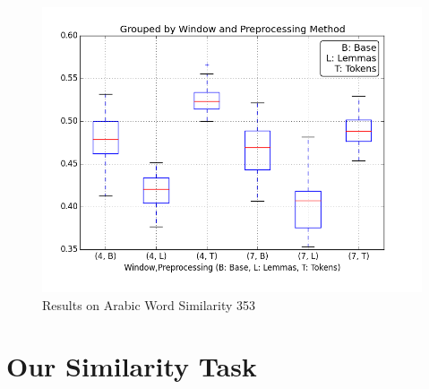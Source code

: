 \begin{figure}
  \includegraphics[width=\linewidth]{results_spearman/ar_similiarity_task_results_ws353_spearplot.png}
  \caption{Results on Arabic Word Similarity 353}
  \label{fig:spearplotws353}
\end{figure}

\section{Our Similarity Task}

